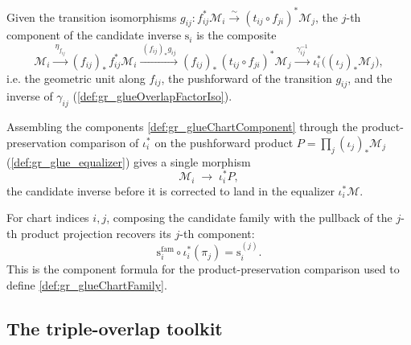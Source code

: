 \begin{definition}\leanok
  \label{def:gr_glueChartComponent}
  Given the transition isomorphisms \(g_{ij} : f_{ij}^{*}\mathcal{M}_i \xrightarrow{\sim}
  (t_{ij}\circ f_{ji})^{*}\mathcal{M}_j\), the \(j\)-th component of the candidate
  inverse \(\mathrm{s}_i\) is the composite
  \[
    \mathcal{M}_i
      \xrightarrow{\ \eta_{f_{ij}}\ }
    (f_{ij})_{*}\,f_{ij}^{*}\mathcal{M}_i
      \xrightarrow{\ (f_{ij})_{*}g_{ij}\ }
    (f_{ij})_{*}\,(t_{ij}\circ f_{ji})^{*}\mathcal{M}_j
      \xrightarrow{\ \gamma_{ij}^{-1}\ }
    \iota_i^{*}\bigl((\iota_j)_{*}\mathcal{M}_j\bigr),
  \]
  i.e. the geometric unit along \(f_{ij}\), the pushforward of the transition
  \(g_{ij}\), and the inverse of \(\gamma_{ij}\) (\cref{def:gr_glueOverlapFactorIso}).
\end{definition}

\begin{definition}\leanok
  \label{def:gr_glueChartFamily}
  Assembling the components \cref{def:gr_glueChartComponent} through the
  product-preservation comparison of \(\iota_i^{*}\) on the pushforward product
  \(P = \prod_j (\iota_j)_{*}\mathcal{M}_j\) (\cref{def:gr_glue_equalizer}) gives a
  single morphism
  \[
    \mathcal{M}_i \;\longrightarrow\; \iota_i^{*}P,
  \]
  the candidate inverse before it is corrected to land in the equalizer
  \(\iota_i^{*}\mathcal{M}\).
\end{definition}

\begin{lemma}\leanok
  \label{lem:gr_glueChartFamily_pullback_map_pi}
  For chart indices \(i,j\), composing the candidate family with the pullback of the
  \(j\)-th product projection recovers its \(j\)-th component:
  \[
    \mathrm{s}_i^{\mathrm{fam}}\circ
      \iota_i^*(\pi_j)=\mathrm{s}_i^{(j)}.
  \]
  This is the component formula for the product-preservation comparison used to
  define \cref{def:gr_glueChartFamily}.
\end{lemma}

\subsection{The triple-overlap toolkit}

